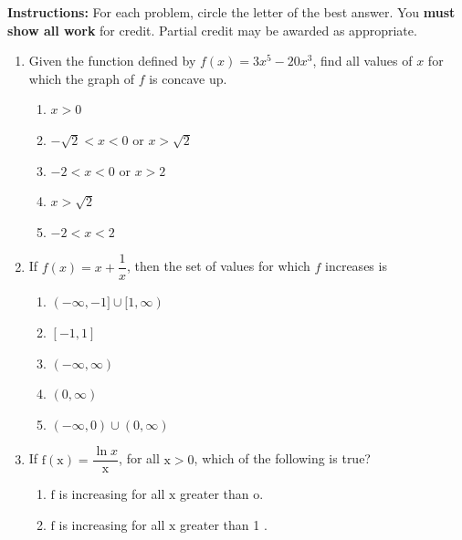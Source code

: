 \documentclass{article}
\begin{document}
\pagestyle{fancy}
\fancyhf{}
\renewcommand{\footrulewidth}{0.4pt}

\noindent
\textbf{Instructions:} For each problem, circle the letter of the best answer.
You \textbf{must show all work} for credit. Partial credit may be awarded as appropriate.

\begin{enumerate}
	\itemsep2em
	\item
	\begin{minipage}[t]{\linewidth}
		Given the function defined by \(f(x)=3 x^{5}-20 x^{3}\), find all values
of \(x\) for which the graph of \(f\) is concave up.
\vspace{1em}
		\begin{enumerate}
		\itemsep1em
			\item \(x>0\)
			\item \(-\sqrt{2}<x<0\) or \(x>\sqrt{2}\)
			\item \(-2<x<0\) or \(x>2\)
			\item \(x>\sqrt{2}\)
			\item \(-2<x<2\)
		\end{enumerate}
	\end{minipage}
	\item
	\begin{minipage}[t]{\linewidth}
		If \(f(x)=x+\dfrac{1}{x}\), then the set of values for which \(f\)
increases is
\vspace{1em}
		\begin{enumerate}
		\itemsep1em
			\item \((-\infty,-1] \cup[1, \infty)\)
			\item \([-1,1]\)
			\item \((-\infty, \infty)\)
			\item \((0, \infty)\)
			\item \((-\infty, 0) \cup(0, \infty)\)
		\end{enumerate}
	\end{minipage}
	\item
	\begin{minipage}[t]{\linewidth}
		If \(\mathrm{f}(\mathrm{x})=\dfrac{\ln x}{\mathrm{x}}\), for all
\(\mathrm{x}>0\), which of the following is true?
\vspace{1em}
		\begin{enumerate}
		\itemsep1em
			\item \(\mathrm{f}\) is increasing for all \(\mathrm{x}\) greater than
\(\mathrm{o}\).
			\item \(\mathrm{f}\) is increasing for all \(\mathrm{x}\) greater than 1 .

\end{enumerate}
\end{minipage}
\end{enumerate}
\end{document}
